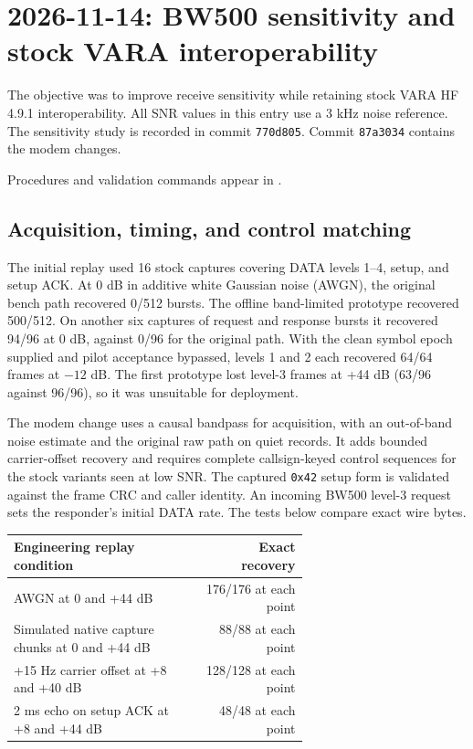 \documentclass[11pt,a4paper]{article}
\newcommand{\pathtext}[1]{\path{#1}}
\begin{document}
\section{2026-11-14: BW500 sensitivity and stock VARA interoperability}
\label{sec:bw500-sensitivity-nov14}

The objective was to improve receive sensitivity while retaining stock
VARA HF 4.9.1 interoperability. All SNR values in this entry use a
3 kHz noise reference. The sensitivity study is recorded in commit
\texttt{770d805}. Commit \texttt{87a3034} contains the modem changes.

Procedures and validation commands appear in
\pathtext{docs/testing/vara-interoperability.md}.

\subsection{Acquisition, timing, and control matching}

The initial replay used 16 stock captures covering DATA levels 1--4,
setup, and setup ACK. At 0 dB in additive white Gaussian noise (AWGN),
the original bench path recovered 0/512 bursts. The offline
band-limited prototype recovered 500/512. On another six captures of
request and response bursts it recovered 94/96 at 0 dB, against 0/96
for the original path. With the clean symbol epoch supplied and
pilot acceptance bypassed, levels 1 and 2 each recovered 64/64 frames
at $-12$ dB. The first prototype lost level-3 frames at +44 dB
(63/96 against 96/96), so it was unsuitable for deployment.

The modem change uses a causal bandpass for acquisition, with an
out-of-band noise estimate and the original raw path on quiet records.
It adds bounded carrier-offset recovery and requires complete
callsign-keyed control sequences for the stock variants seen at low
SNR. The captured \texttt{0x42} setup form is validated against the frame
CRC and caller identity. An incoming BW500 level-3 request sets the
responder's initial DATA rate. The tests below compare exact wire bytes.

\begin{center}
\begin{tabular}{@{}p{0.64\linewidth}r@{}}
\toprule
Engineering replay condition & Exact recovery \\
\midrule
AWGN at 0 and +44 dB & 176/176 at each point \\
Simulated native capture chunks at 0 and +44 dB & 88/88 at each point \\
+15 Hz carrier offset at +8 and +40 dB & 128/128 at each point \\
2 ms echo on setup ACK at +8 and +44 dB & 48/48 at each point \\
\bottomrule
\end{tabular}
\end{center}
\end{document}
